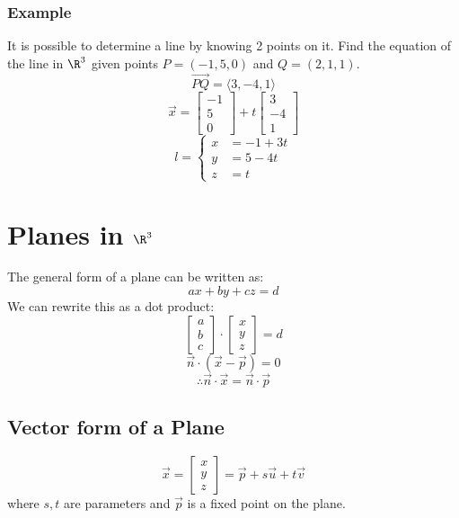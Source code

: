 \documentclass[letterpaper, 12pt]{math}
\begin{document}
\subsubsection*{Example}
It is possible to determine a line by knowing 2 points on it. Find the equation
of the line in \( \R^3 \) given points \( P = (-1,5,0) \) and \( Q = (2,1,1) \).
\[ \overrightarrow{PQ} = \langle3,-4,1\rangle \]
\[ \vec{x} = \begin{bmatrix}-1 \\ 5 \\ 0\end{bmatrix}+
  t\begin{bmatrix}3 \\ -4 \\ 1\end{bmatrix} \]
\[ l = \begin{cases}
  x &= -1+3t \\
  y &= 5-4t \\
  z &= t
\end{cases} \]

\section*{Planes in \( \R^3 \)}
The general form of a plane can be written as:
\[ ax+by+cz = d \]
We can rewrite this as a dot product:
\[ \begin{bmatrix}a \\ b \\ c\end{bmatrix}\cdot
  \begin{bmatrix}x \\ y \\ z\end{bmatrix} = d \]
\[ \vec{n}\cdot(\vec{x}-\vec{p}) = 0 \]
\[ \therefore \vec{n}\cdot\vec{x} = \vec{n}\cdot\vec{p} \]

\subsection*{Vector form of a Plane}
\[ \vec{x} = \begin{bmatrix}x \\ y \\ z\end{bmatrix} =
  \vec{p}+s\vec{u}+t\vec{v} \]
where \( s,t \) are parameters and \( \vec{p} \) is a fixed point on the plane.
\end{document}
